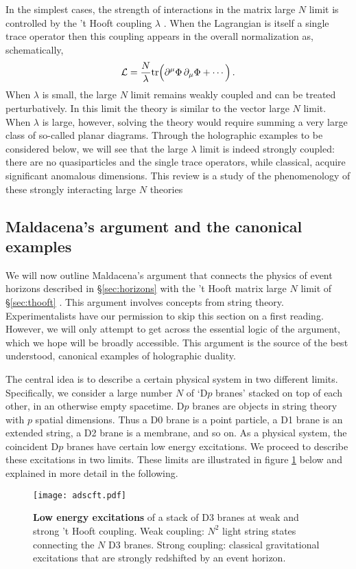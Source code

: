 \documentclass[10pt, oneside]{book}
\let\pa=\partial
\def\be{\begin{equation}}
\def\ee{\end{equation}}
\newcommand{\tr}{{\rm tr} }
\begin{document}
\begin{doublespace}
In the simplest cases, the strength of interactions in the matrix large $N$ limit is controlled by the 't Hooft coupling $\lambda$ \cite{'tHooft:1973jz}. When the Lagrangian is itself a single trace operator then this coupling appears in the overall normalization as, schematically,
\be\label{eq:Lag}
{\mathcal L} = \frac{N}{\lambda} \tr \Big(\pa^\mu \Phi \, \pa_\mu \Phi +  \cdots \Big) \,.
\ee
When $\lambda$ is small, the large $N$ limit remains weakly coupled and can be treated perturbatively. In this limit the theory is similar to the vector large $N$ limit. When $\lambda$ is large, however, solving the theory would require summing a very large class of so-called planar diagrams. Through the holographic examples to be considered below, we will see that the large $\lambda$ limit is indeed strongly coupled: there are no quasiparticles and the single trace operators, while classical, acquire significant anomalous dimensions. This review is a study of the phenomenology of these strongly interacting large $N$ theories

\subsection{Maldacena's argument and the canonical examples}
\label{sec:malda}

We will now outline Maldacena's argument that connects the physics of event horizons described in \S \ref{sec:horizons} with the 't Hooft matrix large $N$ limit of \S \ref{sec:thooft} \cite{Maldacena:1997re, Maldacena:2011ut}. This argument involves concepts from string theory. Experimentalists have our permission to skip this section on a first reading. However, we will only attempt to get across the essential logic of the argument, which we hope will be broadly accessible. This argument is the source of the best understood, canonical examples of holographic duality.

The central idea is to describe a certain physical system in two different limits. Specifically, we consider a large number $N$ of `D$p$ branes' stacked on top of each other, in an otherwise empty spacetime. D$p$ branes are objects in string theory with $p$ spatial dimensions. Thus a D0 brane is a point particle, a D1 brane is an extended string, a D2 brane is a membrane, and so on. As a physical system, the coincident D$p$ branes have certain low energy excitations. We proceed to describe these excitations in two limits. These limits are illustrated in figure \ref{fig:branes} below and explained in more detail in the following.
\begin{figure}[h]
\centering
\texttt{[image: adscft.pdf]}
\caption{\label{fig:branes} {\bf Low energy excitations} of a stack of D3 branes at weak and strong 't Hooft coupling. Weak coupling: $N^2$ light string states connecting the $N$ D3 branes. Strong coupling: classical gravitational excitations that are strongly redshifted by an event horizon.}
\end{figure}


\end{doublespace}
\end{document}
